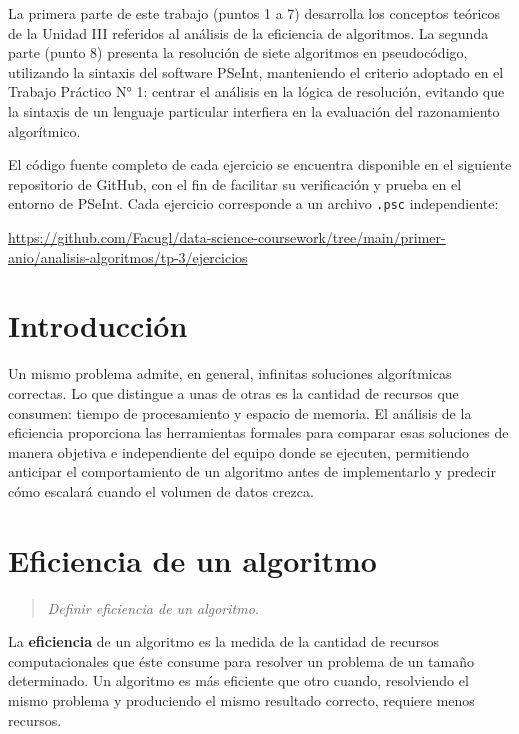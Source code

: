 \documentclass[12pt]{article}
\newcommand{\enunciado}[1]{%
    \begin{quote}
        \itshape #1
    \end{quote}
}
\begin{document}
La primera parte de este trabajo (puntos 1 a 7) desarrolla los conceptos teóricos de la Unidad III referidos al análisis de la eficiencia de algoritmos. La segunda parte (punto 8) presenta la resolución de siete algoritmos en pseudocódigo, utilizando la sintaxis del software PSeInt, manteniendo el criterio adoptado en el Trabajo Práctico N° 1: centrar el análisis en la lógica de resolución, evitando que la sintaxis de un lenguaje particular interfiera en la evaluación del razonamiento algorítmico.

El código fuente completo de cada ejercicio se encuentra disponible en el siguiente repositorio de GitHub, con el fin de facilitar su verificación y prueba en el entorno de PSeInt. Cada ejercicio corresponde a un archivo \texttt{.psc} independiente:

\begin{center}
    \url{https://github.com/Facugl/data-science-coursework/tree/main/primer-anio/analisis-algoritmos/tp-3/ejercicios}
\end{center}

\section*{Introducción}

Un mismo problema admite, en general, infinitas soluciones algorítmicas correctas. Lo que distingue a unas de otras es la cantidad de recursos que consumen: tiempo de procesamiento y espacio de memoria. El análisis de la eficiencia proporciona las herramientas formales para comparar esas soluciones de manera objetiva e independiente del equipo donde se ejecuten, permitiendo anticipar el comportamiento de un algoritmo antes de implementarlo y predecir cómo escalará cuando el volumen de datos crezca.


\newpage
\section{Eficiencia de un algoritmo}

\enunciado{Definir eficiencia de un algoritmo.}

La \textbf{eficiencia} de un algoritmo es la medida de la cantidad de recursos computacionales que éste consume para resolver un problema de un tamaño determinado. Un algoritmo es más eficiente que otro cuando, resolviendo el mismo problema y produciendo el mismo resultado correcto, requiere menos recursos.
\end{document}

